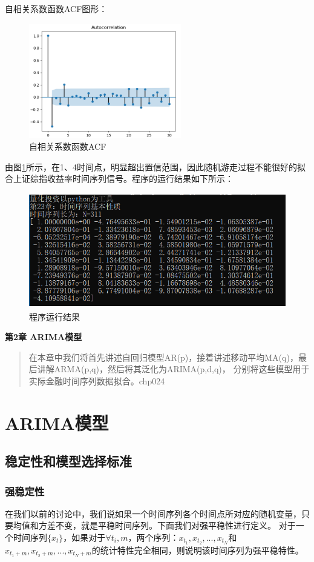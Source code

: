 \documentclass{article}
\begin{document}
自相关系数函数ACF图形：
\begin{figure}[H]
	\caption{自相关系数函数ACF}
	\label{f000011}
	\centering
	\includegraphics[height=5cm]{images/f000011}
\end{figure}
由图\ref{f000011}所示，在1、4时间点，明显超出置信范围，因此随机游走过程不能很好的拟合上证综指收益率时间序列信号。程序的运行结果如下所示：
\begin{figure}[H]
	\caption{程序运行结果}
	\label{f000012}
	\centering
	\includegraphics[height=5cm]{images/f000012}
\end{figure}

\maketitle\begin{center}
\Large \textbf{第2章 ARIMA模型}
\end{center}
\begin{abstract}
在本章中我们将首先讲述自回归模型AR(p)，接着讲述移动平均MA(q)，最后讲解ARMA(p,q)，然后将其泛化为ARIMA(p,d,q)，
分别将这些模型用于实际金融时间序列数据拟合。chp024
\end{abstract}
\section{ARIMA模型}
\subsection{稳定性和模型选择标准}
\subsubsection{强稳定性}
在我们以前的讨论中，我们说如果一个时间序列各个时间点所对应的随机变量，只要均值和方差不变，就是平稳时间序列。下面我们对强平稳性进行定义。\newline
对于一个时间序列$\{ x_{t} \}$，如果对于$\forall t_{i},m$，两个序列：$x_{t_1}, x_{t_2},...,x_{t_N}$和$x_{t_1+m}, x_{t_2+m},...,x_{t_N+m}$的统计特性完全相同，则说明该时间序列为强平稳特性。
\end{document}
